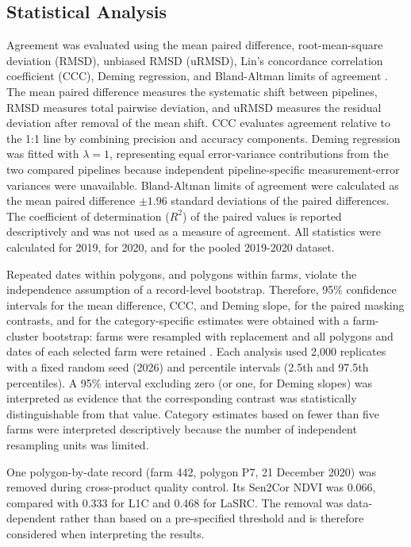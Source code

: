 \documentclass[
  authoryear,
  preprint]{elsarticle}
\begin{document}
\subsection{Statistical Analysis}\label{sec-statistics}

Agreement was evaluated using the mean paired difference,
root-mean-square deviation (RMSD), unbiased RMSD (uRMSD), Lin's
concordance correlation coefficient (CCC), Deming regression, and
Bland-Altman limits of agreement
\citep{Lin1989, Linnet1993, BlandAltman1986}. The mean paired difference
measures the systematic shift between pipelines, RMSD measures total
pairwise deviation, and uRMSD measures the residual deviation after
removal of the mean shift. CCC evaluates agreement relative to the 1:1
line by combining precision and accuracy components. Deming regression
was fitted with \(\lambda=1\), representing equal error-variance
contributions from the two compared pipelines because independent
pipeline-specific measurement-error variances were unavailable.
Bland-Altman limits of agreement were calculated as the mean paired
difference \(\pm 1.96\) standard deviations of the paired differences.
The coefficient of determination (\(R^2\)) of the paired values is
reported descriptively and was not used as a measure of agreement. All
statistics were calculated for 2019, for 2020, and for the pooled
2019-2020 dataset.

Repeated dates within polygons, and polygons within farms, violate the
independence assumption of a record-level bootstrap. Therefore, 95\%
confidence intervals for the mean difference, CCC, and Deming slope, for
the paired masking contrasts, and for the category-specific estimates
were obtained with a farm-cluster bootstrap: farms were resampled with
replacement and all polygons and dates of each selected farm were
retained \citep{DavisonHinkley1997}. Each analysis used 2,000 replicates
with a fixed random seed (2026) and percentile intervals (2.5th and
97.5th percentiles). A 95\% interval excluding zero (or one, for Deming
slopes) was interpreted as evidence that the corresponding contrast was
statistically distinguishable from that value. Category estimates based
on fewer than five farms were interpreted descriptively because the
number of independent resampling units was limited.

One polygon-by-date record (farm 442, polygon P7, 21 December 2020) was
removed during cross-product quality control. Its Sen2Cor NDVI was
0.066, compared with 0.333 for L1C and 0.468 for LaSRC. The removal was
data-dependent rather than based on a pre-specified threshold and is
therefore considered when interpreting the results.
\end{document}
